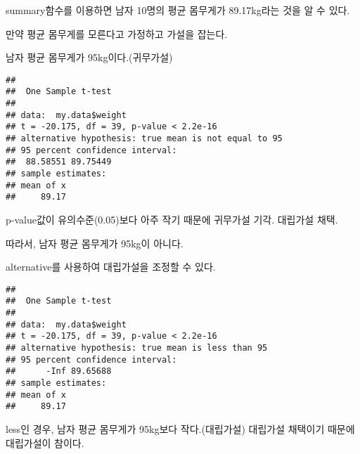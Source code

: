 \documentclass[
]{article}
\newenvironment{Shaded}{\begin{snugshade}}{\end{snugshade}}
\newcommand{\AttributeTok}[1]{\textcolor[rgb]{0.77,0.63,0.00}{#1}}
\newcommand{\DecValTok}[1]{\textcolor[rgb]{0.00,0.00,0.81}{#1}}
\newcommand{\FunctionTok}[1]{\textcolor[rgb]{0.00,0.00,0.00}{#1}}
\newcommand{\NormalTok}[1]{#1}
\newcommand{\OtherTok}[1]{\textcolor[rgb]{0.56,0.35,0.01}{#1}}
\newcommand{\SpecialCharTok}[1]{\textcolor[rgb]{0.00,0.00,0.00}{#1}}
\newcommand{\StringTok}[1]{\textcolor[rgb]{0.31,0.60,0.02}{#1}}
\begin{document}
summary함수를 이용하면 남자 10명의 평균 몸무게가 89.17kg라는 것을 알 수 있다.

만약 평균 몸무게를 모른다고 가정하고 가설을 잡는다.

남자 평균 몸무게가 95kg이다.(귀무가설)

\begin{Shaded}
\end{Shaded}

\begin{verbatim}
## 
##  One Sample t-test
## 
## data:  my.data$weight
## t = -20.175, df = 39, p-value < 2.2e-16
## alternative hypothesis: true mean is not equal to 95
## 95 percent confidence interval:
##  88.58551 89.75449
## sample estimates:
## mean of x 
##     89.17
\end{verbatim}

p-value값이 유의수준(0.05)보다 아주 작기 때문에 귀무가설 기각. 대립가설 채택.

따라서, 남자 평균 몸무게가 95kg이 아니다.

alternative를 사용하여 대립가설을 조정할 수 있다.

\begin{Shaded}
\end{Shaded}

\begin{verbatim}
## 
##  One Sample t-test
## 
## data:  my.data$weight
## t = -20.175, df = 39, p-value < 2.2e-16
## alternative hypothesis: true mean is less than 95
## 95 percent confidence interval:
##      -Inf 89.65688
## sample estimates:
## mean of x 
##     89.17
\end{verbatim}

less인 경우, 남자 평균 몸무게가 95kg보다 작다.(대립가설) 대립가설 채택이기 때문에 대립가설이 참이다.

\begin{Shaded}
\end{Shaded}
\end{document}
